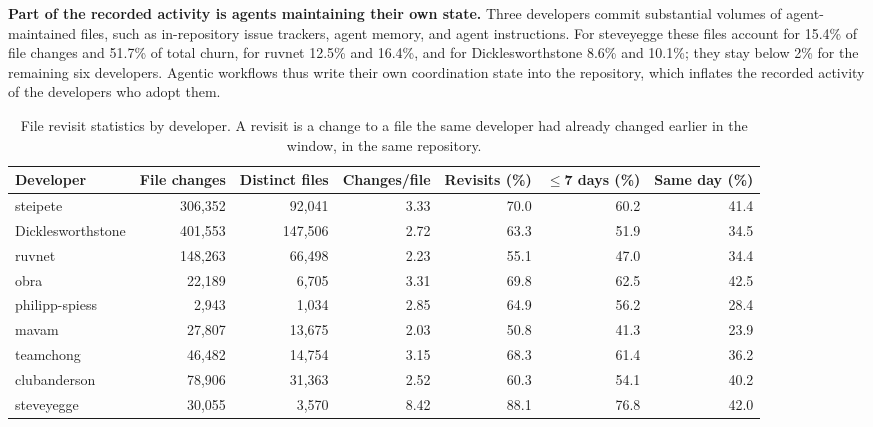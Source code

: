 \documentclass[smallextended]{svjour3}
\begin{document}
\textbf{Part of the recorded activity is agents maintaining their own state.}
Three developers commit substantial volumes of agent-maintained files, such as
in-repository issue trackers, agent memory, and agent instructions. For
steveyegge these files account for 15.4\% of file changes and 51.7\% of total
churn, for ruvnet 12.5\% and 16.4\%, and for Dicklesworthstone 8.6\% and 10.1\%;
they stay below 2\% for the remaining six developers. Agentic workflows thus
write their own coordination state into the repository, which inflates the
recorded activity of the developers who adopt them.

\begin{table}[tbp]
  \caption{File revisit statistics by developer. A revisit is a change to a file
    the same developer had already changed earlier in the window, in the same
    repository.}
  \label{tab:rq4-rework}
  \centering
  \scriptsize
  \setlength{\tabcolsep}{4pt}
  \begin{tabular}{lrrrrrr}
    \toprule
    Developer & File changes & Distinct files & Changes/file & Revisits (\%) & $\leq$7 days (\%) & Same day (\%) \\
    \midrule
    steipete & 306,352 & 92,041 & 3.33 & 70.0 & 60.2 & 41.4 \\
    Dicklesworthstone & 401,553 & 147,506 & 2.72 & 63.3 & 51.9 & 34.5 \\
    ruvnet & 148,263 & 66,498 & 2.23 & 55.1 & 47.0 & 34.4 \\
    obra & 22,189 & 6,705 & 3.31 & 69.8 & 62.5 & 42.5 \\
    philipp-spiess & 2,943 & 1,034 & 2.85 & 64.9 & 56.2 & 28.4 \\
    mavam & 27,807 & 13,675 & 2.03 & 50.8 & 41.3 & 23.9 \\
    teamchong & 46,482 & 14,754 & 3.15 & 68.3 & 61.4 & 36.2 \\
    clubanderson & 78,906 & 31,363 & 2.52 & 60.3 & 54.1 & 40.2 \\
    steveyegge & 30,055 & 3,570 & 8.42 & 88.1 & 76.8 & 42.0 \\
    \bottomrule
  \end{tabular}
\end{table}
\end{document}

